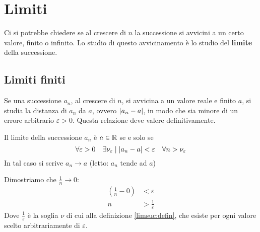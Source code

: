 %
%
%
%


\section{Limiti}
Ci si potrebbe chiedere se al crescere di $n$ la successione si avvicini a un certo valore, finito o infinito. Lo studio di questo avvicinamento è lo studio del \textbf{limite} della successione.


\subsection{Limiti finiti}
Se una successione $a_n$, al crescere di $n$, si avvicina a un valore reale e finito $a$, si studia la distanza di $a_n$ da $a$, ovvero $\left\lvert a_n-a \right\rvert$, in modo che sia minore di un errore arbitrario $\varepsilon>0$. Questa relazione deve valere definitivamente.
\begin{defin}
	Il limite della successione $a_n$ è $a\in\mathbb{R}$ se e solo se
	\label{limsuc:defin}
	\[
		\forall\varepsilon>0\quad\exists\nu_\varepsilon\mid\left\lvert a_n-a \right\rvert<\varepsilon\quad\forall n>\nu_\varepsilon
	\]
	In tal caso si scrive $a_n\to a$ (letto: $a_n$ tende ad $a$)
\end{defin}

\begin{examp}
	Dimostriamo che $\frac{1}{n}\to 0$:
	\begin{align*}
		(\frac{1}{n}-0) & <\varepsilon           \\
		n               & >\frac{1}{\varepsilon}
	\end{align*}
	Dove $\frac{1}{\varepsilon}$ è la soglia $\nu$ di cui alla definizione \ref{limsuc:defin}, che esiste per ogni valore scelto arbitrariamente di $\varepsilon$.
\end{examp}

